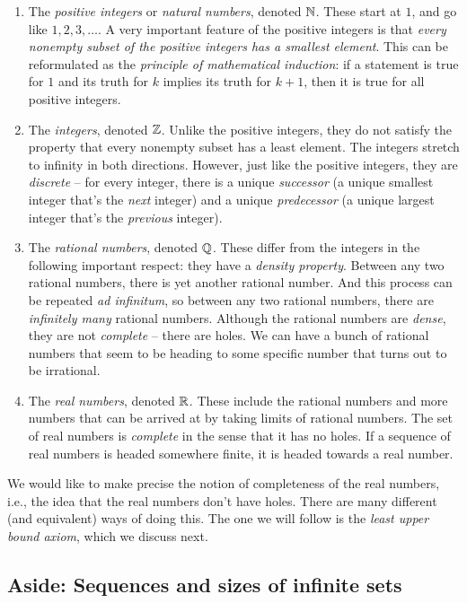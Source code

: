 \documentclass{amsart}
\begin{document}
\begin{enumerate}
\item The {\em positive integers} or {\em natural numbers}, denoted
  $\mathbb{N}$. These start at $1$, and go like $1,2,3,\dots$. A very
  important feature of the positive integers is that {\em every
  nonempty subset of the positive integers has a smallest
  element}. This can be reformulated as the {\em principle of
  mathematical induction}: if a statement is true for $1$ and its
  truth for $k$ implies its truth for $k + 1$, then it is true for all
  positive integers.
\item The {\em integers}, denoted $\mathbb{Z}$. Unlike the positive integers,
  they do not satisfy the property that every nonempty subset has a
  least element. The integers stretch to infinity in both
  directions. However, just like the positive integers, they are {\em
  discrete} -- for every integer, there is a unique {\em successor} (a
  unique smallest integer that's the {\em next} integer) and a unique
  {\em predecessor} (a unique largest integer that's the {\em
  previous} integer).
\item The {\em rational numbers}, denoted $\mathbb{Q}$. These differ from the
  integers in the following important respect: they have a {\em
  density property}. Between any two rational numbers, there is yet
  another rational number. And this process can be repeated {\em ad
  infinitum}, so between any two rational numbers, there are {\em
  infinitely many} rational numbers. Although the rational numbers are
  {\em dense}, they are not {\em complete} -- there are holes. We can
  have a bunch of rational numbers that seem to be heading to some
  specific number that turns out to be irrational.
\item The {\em real numbers}, denoted $\mathbb{R}$. These include the rational
  numbers and more numbers that can be arrived at by taking limits of
  rational numbers. The set of real numbers is {\em complete} in the
  sense that it has no holes. If a sequence of real numbers is headed
  somewhere finite, it is headed towards a real number.
\end{enumerate}

We would like to make precise the notion of completeness of the real
numbers, i.e., the idea that the real numbers don't have holes. There
are many different (and equivalent) ways of doing this. The one we
will follow is the {\em least upper bound axiom}, which we discuss next.

\subsection*{Aside: Sequences and sizes of infinite sets}
\end{document}
